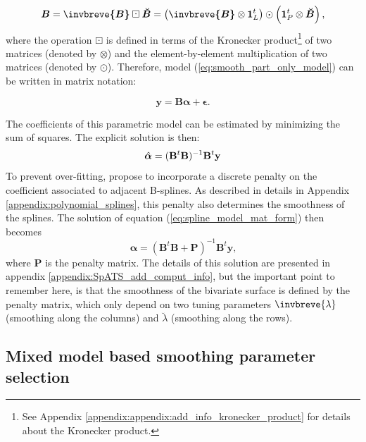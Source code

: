 \begin{equation}
    \boldsymbol{B} = \boldsymbol{\invbreve{B}} \boxdot \boldsymbol{\breve{B}} = \left( \boldsymbol{\invbreve{B}} \otimes
    \boldsymbol{1} _ { L } ^ { t } \right) \odot \left( \mathbf { 1 } _ { P } ^ { t } \otimes \boldsymbol{\breve{B}} \right)
    \text{,}
\end{equation}
where the operation $\boxdot$ is defined in terms of the Kronecker product\footnote{See Appendix \ref{appendix:appendix:add_info_kronecker_product} for details about the Kronecker product.} of two matrices (denoted by $\otimes$) and the 
element-by-element multiplication of two matrices (denoted by $\odot$). Therefore, model (\ref{eq:smooth_part_only_model}) can be written in matrix 
notation:

\begin{equation}
    \boldsymbol{y} = \boldsymbol{B}\boldsymbol{\alpha} + \boldsymbol{\epsilon}
    \text{.}
    \label{eq:spline_model_mat_form}
\end{equation}

The coefficients of this parametric model can be estimated by minimizing the sum of squares. The explicit solution is then:
\begin{equation}
	\Hat{\boldsymbol{\alpha}} = (\mathbf{B}^t\mathbf{B})^{-1}\mathbf{B}^t\mathbf{y}
\end{equation}
To prevent over-fitting, 
\textcite{eilers_flexible_1996} propose to incorporate a discrete penalty on the coefficient associated to adjacent B-splines.
As described in details in Appendix \ref{appendix:polynomial_splines}, this penalty also determines the smoothness of the 
splines. The solution of equation (\ref{eq:spline_model_mat_form}) then becomes 
\begin{equation}
    \widehat{\boldsymbol{\alpha}}=\left(\boldsymbol{B}^{t} \boldsymbol{B}+\boldsymbol{P}\right)^{-1} \boldsymbol{B}^{t} 
    \boldsymbol{y}
    \text{,}
\end{equation}
where $\boldsymbol{P}$ is the penalty matrix. The details of this solution are presented in appendix 
\ref{appendix:SpATS_add_comput_info}, but the important point to remember here, is that the smoothness of the bivariate 
surface is defined by the penalty matrix, which only depend on two tuning parameters  $\invbreve{\lambda}$ (smoothing along the 
columns) and $\breve{\lambda}$ (smoothing along the rows).

\subsection{Mixed model based smoothing parameter selection}

